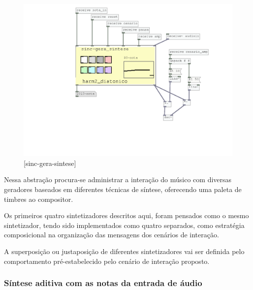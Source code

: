 \documentclass{ppgmus}
\begin{document}
\begin{figure}
\includegraphics[scale=.6]{sinc-gera-sintese}
\caption{[sinc-gera-sintese]}
\label{sincgerasintese}
\end{figure}



Nessa abstração procura-se administrar a interação do músico
com diversas geradores baseados em diferentes técnicas de síntese,
oferecendo uma paleta de timbres ao compositor.

Os primeiros quatro sintetizadores descritos aqui, foram pensados como o mesmo
sintetizador, tendo sido implementados como quatro separados, como estratégia
composicional na organização das mensagens dos cenários de interação.




A superposição ou justaposição de diferentes sintetizadores vai
ser definida pelo comportamento pré-estabelecido pelo cenário de interação
proposto.





\subsubsection{Síntese aditiva com as notas da entrada de áudio}
\end{document}
